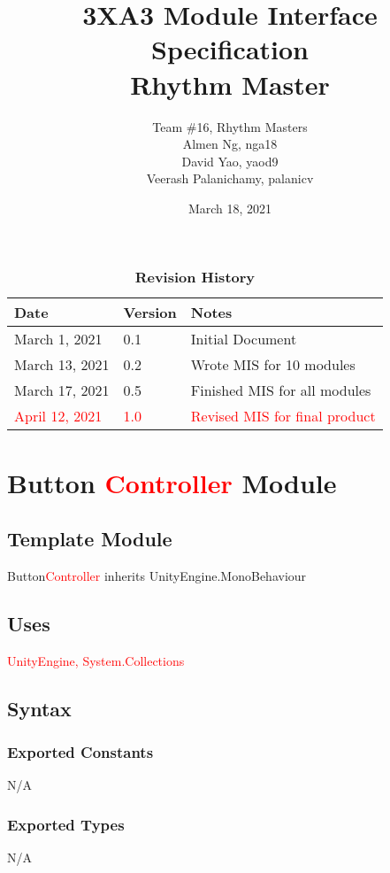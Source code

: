 \documentclass[12pt]{article}
\title{3XA3 Module Interface Specification\\ Rhythm Master}
\author{Team \#16, Rhythm Masters
    \\ Almen Ng, nga18
    \\ David Yao, yaod9
    \\ Veerash Palanichamy, palanicv}
\date{March 18, 2021}
\begin{document}
 
\maketitle
\newpage
\tableofcontents
\listoftables
\listoffigures

\newpage
\begin{table}[h]
\caption{\bf Revision History}
\begin{tabularx}{\textwidth}{p{3cm}p{2cm}X}
\toprule {\bf Date} & {\bf Version} & {\bf Notes}\\
\midrule
March 1, 2021 & 0.1 & Initial Document\\
March 13, 2021 & 0.2 & Wrote MIS for 10 modules\\
March 17, 2021 & 0.5 & Finished MIS for all modules\\
\textcolor{red}{April 12, 2021} & \textcolor{red}{1.0} & \textcolor{red}{Revised MIS for final product}\\
\bottomrule
\end{tabularx}
\end{table}

\newpage
\section {Button \textcolor{red}{Controller} Module}

\subsection{Template Module}
Button\textcolor{red}{Controller} inherits UnityEngine.MonoBehaviour

\subsection {Uses}
\textcolor{red}{UnityEngine, System.Collections}

\subsection {Syntax}

\subsubsection {Exported Constants}
N/A
\subsubsection {Exported Types}
N/A
\end{document}
